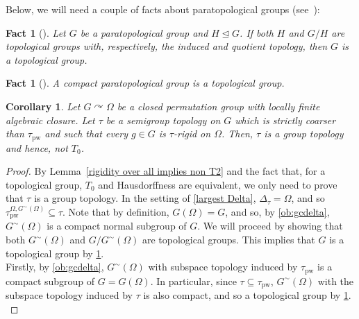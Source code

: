 \documentclass{article}
\newtheorem{corollary}[theorem]{Corollary}
\newtheorem{fact}[theorem]{Fact}
\theoremstyle{remark}
\theoremstyle{definition}
\def\acts{\curvearrowright}
\newcommand{\pw}[0]{\tau_{\mathrm{pw}}}
\newcommand{\gc}[0]{G^{\sim}}
\begin{document}
{{{{{{Below, we will need a couple of facts about paratopological groups (see~\cite[Section 3]{tkachenko2013paratopological}):}

  \begin{fact}[{\cite[Lemma 4]{RavskyHClosed}}]\label{fact: paratopological quotient} Let $G$ be a paratopological group and $H\unlhd G$. If both $H$ and $G/H$ are topological groups with, respectively, the induced and quotient topology, then $G$ is a topological group.
  \end{fact}

  \begin{fact}[{\cite[Proposition 3.2]{tkachenko2013paratopological}}]\label{fact: paratopological compact} A compact paratopological group is a topological group.  
  \end{fact}
  

  \begin{corollary} \label{cor:T0} {Let $G\acts\Omega$ be a closed permutation group with locally finite algebraic closure. Let $\tau$ be a semigroup topology on $G$ which is strictly coarser than $\pw$ and such that every $g\in G$ is $\tau$-rigid on $\Omega$. Then, $\tau$ is a group topology and hence, not $T_0$.}
\end{corollary}
\begin{proof} {By Lemma~\ref{rigidity over all implies non T2} and the fact that, for a topological group, $T_0$ and Hausdorffness are equivalent, we only need to prove that $\tau$ is a group topology. In the setting of \cref{largest Delta}, $\Delta_\tau=\Omega$, and so $\pw^{\Omega, \gc(\Omega)}\subseteq\tau$. Note that by definition, $G(\Omega)=G$, and so, by \cref{ob:gcdelta}, $\gc(\Omega)$ is a compact normal subgroup of $G$. We will proceed by showing that both $\gc(\Omega)$ and $G/\gc(\Omega)$ are topological groups. This implies that $G$ is a topological group by \cref{fact: paratopological quotient}.}\\

{Firstly, by \cref{ob:gcdelta}, $\gc(\Omega)$ with subspace topology induced by $\pw$ is a compact subgroup of $G=G(\Omega)$. In particular, since $\tau\subseteq\pw$, $\gc(\Omega)$ with the subspace topology induced by $\tau$ is also compact, and so a topological group by \cref{fact: paratopological compact}.}\\


\end{proof}}}}}}
\end{document}
